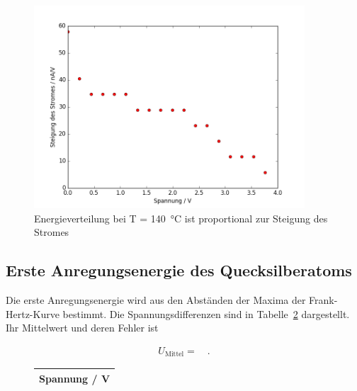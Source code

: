 \begin{figure}
	\centering
	\includegraphics[width=0.9\textwidth]{build/Energieverteilung_140.png}
	\caption{Energieverteilung bei  T = \SI{140}{\celsius} ist proportional zur Steigung des Stromes}
	\label{fig:energieverteilung_140}
\end{figure}

\clearpage

\subsection{Erste Anregungsenergie des Quecksilberatoms}\label{sec:auswertung2}
Die erste Anregungsenergie wird aus den Abständen der Maxima der Frank-Hertz-Kurve bestimmt. Die Spannungsdifferenzen sind in Tabelle~\ref{tab:anregungsspannung} dargestellt. Ihr Mittelwert und deren Fehler ist

\begin{align}
	U_{\text{Mittel}} =  \quad .
\end{align}

\begin{figure}[h!]
	\centering
	\begin{tabular}{c}
		Spannung / \si{\volt}   \\
		\hline
		
	\end{tabular}
	\label{tab:anregungsspannung}
\end{figure}

